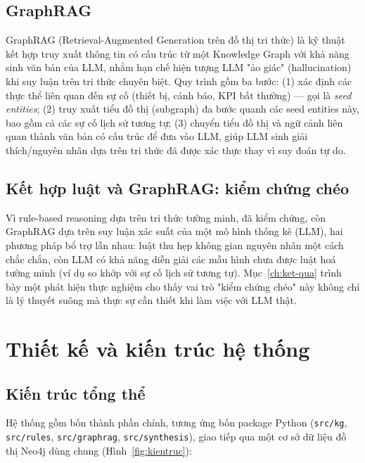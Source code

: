 \documentclass[12pt,a4paper]{report}
\newcommand{\code}[1]{\texttt{\small #1}}
\begin{document}
\section{GraphRAG}

GraphRAG (Retrieval-Augmented Generation trên đồ thị tri thức) là kỹ thuật kết hợp truy xuất thông
tin có cấu trúc từ một Knowledge Graph với khả năng sinh văn bản của LLM, nhằm hạn chế hiện tượng
LLM "ảo giác" (hallucination) khi suy luận trên tri thức chuyên biệt. Quy trình gồm ba bước: (1)
xác định các thực thể liên quan đến sự cố (thiết bị, cảnh báo, KPI bất thường) --- gọi là
\emph{seed entities}; (2) truy xuất tiểu đồ thị (subgraph) đa bước quanh các seed entities này,
bao gồm cả các sự cố lịch sử tương tự; (3) chuyển tiểu đồ thị và ngữ cảnh liên quan thành văn bản
có cấu trúc để đưa vào LLM, giúp LLM sinh giải thích/nguyên nhân dựa trên tri thức đã được xác thực
thay vì suy đoán tự do.

\section{Kết hợp luật và GraphRAG: kiểm chứng chéo}
\label{sec:crossval-theory}

Vì rule-based reasoning dựa trên tri thức tường minh, đã kiểm chứng, còn GraphRAG dựa trên suy
luận xác suất của một mô hình thống kê (LLM), hai phương pháp bổ trợ lẫn nhau: luật thu hẹp không
gian nguyên nhân một cách chắc chắn, còn LLM có khả năng diễn giải các mẫu hình chưa được luật hoá
tường minh (ví dụ so khớp với sự cố lịch sử tương tự). Mục~\ref{ch:ket-qua} trình bày một phát hiện
thực nghiệm cho thấy vai trò "kiểm chứng chéo" này không chỉ là lý thuyết suông mà thực sự cần
thiết khi làm việc với LLM thật.

\chapter{Thiết kế và kiến trúc hệ thống}

\section{Kiến trúc tổng thể}

Hệ thống gồm bốn thành phần chính, tương ứng bốn package Python (\code{src/kg}, \code{src/rules},
\code{src/graphrag}, \code{src/synthesis}), giao tiếp qua một cơ sở dữ liệu đồ thị Neo4j dùng
chung (Hình~\ref{fig:kientruc}):
\end{document}
